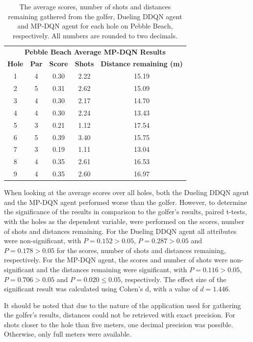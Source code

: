 \documentclass{kththesis}
\begin{document}
\begin{table}
    \begin{subtable}{\textwidth}
    \centering
    \begin{tabular}{c|c|c|c|c}
    \multicolumn{5}{c}{\textbf{Pebble Beach Average MP-DQN Results}} \\
        \textbf{Hole} & \textbf{Par} & \textbf{Score} & \textbf{Shots} & \textbf{Distance remaining (m)}  \\ \hline
        1 & 4 & 0.30 & 2.22 & 15.19 \\ 
        2 & 5 & 0.31 & 2.62 & 15.09 \\ 
        3 & 4 & 0.30 & 2.17 & 14.70 \\ 
        4 & 4 & 0.30 & 2.24 & 13.43 \\ 
        5 & 3 & 0.21 & 1.12 & 17.54 \\ 
        6 & 5 & 0.39 & 3.40 & 15.75 \\ 
        7 & 3 & 0.19 & 1.11 & 13.04 \\ 
        8 & 4 & 0.35 & 2.61 & 16.53 \\ 
        9 & 4 & 0.35 & 2.60 & 16.97 \\ 
    \end{tabular}
    \end{subtable}
    \caption{The average scores, number of shots and distances remaining gathered from the golfer, Dueling DDQN agent and MP-DQN agent for each hole on Pebble Beach, respectively. All numbers are rounded to two decimals.}
    \label{tab:pebble_average_results}
\end{table}

When looking at the average scores over all holes, both the Dueling DDQN agent and the MP-DQN agent performed worse than the golfer. However, to determine the significance of the results in comparison to the golfer's results, paired t-tests, with the holes as the dependent variable, were performed on the scores, number of shots and distances remaining. For the Dueling DDQN agent all attributes were non-significant, with $P = 0.152 > 0.05$, $P = 0.287 > 0.05$ and $P = 0.178 > 0.05$ for the scores, number of shots and distances remaining, respectively. For the MP-DQN agent, the scores and number of shots were non-significant and the distances remaining were significant, with $P = 0.116 > 0.05$, $P = 0.706 > 0.05$ and $P = 0.020 \leq 0.05$, respectively. The effect size of the significant result was calculated using Cohen's d, with a value of $d = 1.446$.

It should be noted that due to the nature of the application used for gathering the golfer's results, distances could not be retrieved with exact precision. For shots closer to the hole than five meters, one decimal precision was possible. Otherwise, only full meters were available.
\end{document}
